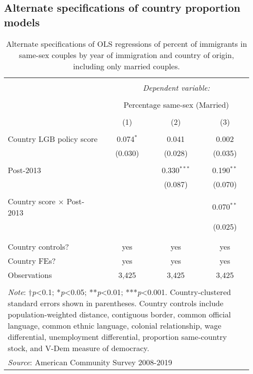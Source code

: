 \documentclass[
  11pt,
]{article}
\begin{document}
\newpage

\hypertarget{alternate-specifications-of-country-proportion-models}{%
\subsection{Alternate specifications of country proportion models}\label{alternate-specifications-of-country-proportion-models}}

\begin{table}[H] \centering 
  \caption{Alternate specifications of OLS regressions of percent of immigrants in same-sex couples by year of immigration and country of origin, including only married couples.} 
  \label{tab:country-props-alt} 
\begin{tabular}{@{\extracolsep{5pt}}lccc} 
\\[-1.8ex]\hline 
\hline \\[-1.8ex] 
 & \multicolumn{3}{c}{\textit{Dependent variable:}} \\ 
\cline{2-4} 
\\[-1.8ex] & \multicolumn{3}{c}{Percentage same-sex (Married)} \\ 
\\[-1.8ex] & (1) & (2) & (3)\\ 
\hline \\[-1.8ex] 
 Country LGB policy score & 0.074$^{*}$ & 0.041 & 0.002 \\ 
  & (0.030) & (0.028) & (0.035) \\ 
  & & & \\ 
 Post-2013 &  & 0.330$^{***}$ & 0.190$^{**}$ \\ 
  &  & (0.087) & (0.070) \\ 
  & & & \\ 
 Country score × Post-2013 &  &  & 0.070$^{**}$ \\ 
  &  &  & (0.025) \\ 
  & & & \\ 
\hline \\[-1.8ex] 
Country controls? & yes & yes & yes \\ 
Country FEs? & yes & yes & yes \\ 
Observations & 3,425 & 3,425 & 3,425 \\ 
\hline 
\hline \\[-1.8ex] 
\multicolumn{4}{l}{\parbox[t]{.7\textwidth}{\textit{Note}: †\textit{p}<0.1; *\textit{p}<0.05; **\textit{p}<0.01; ***\textit{p}<0.001. Country-clustered standard errors shown in parentheses. Country controls include population-weighted distance, contiguous border, common official language, common ethnic language, colonial relationship, wage differential, unemployment differential, proportion same-country stock, and V-Dem measure of democracy.}} \\ 
\multicolumn{4}{l}{\textit{Source}: American Community Survey 2008-2019} \\ 
\end{tabular} 
\end{table}
\end{document}
